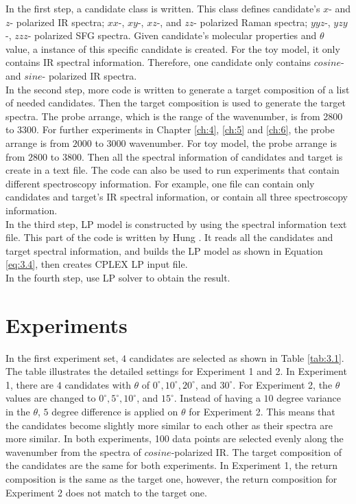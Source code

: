 In the first step, a candidate class is written. This class defines candidate's $x$- and $z$- polarized IR spectra; $xx$-, $xy$-, $xz$-, and $zz$- polarized Raman spectra; $yyz$-, $yzy$-, $zzz$- polarized SFG spectra. Given candidate's molecular properties and $\theta$ value, a instance of this specific candidate is created. For the toy model, it only contains IR spectral information. Therefore, one candidate only contains $cosine$- and $sine$- polarized IR spectra. \\

In the second step, more code is written to generate a target composition of a list of needed candidates. Then the target composition is used to generate the target spectra. The probe arrange, which is the range of the wavenumber, is from 2800 to 3300. For further experiments in Chapter \ref{ch:4}, \ref{ch:5} and \ref{ch:6}, the probe arrange is from $2000$ to $3000$ wavenumber. For toy model, the probe arrange is from $2800$ to $3800$. Then all the spectral information of candidates and target is create in a text file. The code can also be used to run experiments that contain different spectroscopy information. For example, one file can contain only candidates and target's IR spectral information, or contain all three spectroscopy information. \\

In the third step, LP model is constructed by using the spectral information text file. This part of the code is written by Hung \cite{KuoKaiHung:Thesis:2015}. It reads all the candidates and target spectral information, and builds the LP model as shown in Equation \ref{eq:3.4}, then creates CPLEX LP input file. \\

In the fourth step, use LP solver to obtain the result. \\

\section{Experiments}
In the first experiment set,  $4$ candidates are selected as shown in Table \ref{tab:3.1}. The table illustrates the detailed settings for Experiment 1 and 2. In Experiment 1, there are $4$ candidates with $\theta$ of $0^{\circ}, 10^{\circ}, 20^{\circ}$, and $30^{\circ}$. For Experiment 2, the $\theta$ values are changed to $0^{\circ}, 5^{\circ}, 10^{\circ}$, and $15^{\circ}$. Instead of having a $10$ degree variance in the $\theta$, $5$ degree difference is applied on $\theta$ for Experiment 2. This means that the candidates become slightly more similar to each other as their spectra are more similar. In both experiments, 100 data points are selected evenly along the wavenumber from the spectra of $cosine$-polarized IR. The target composition of the candidates are the same for both experiments. In Experiment 1, the return composition is the same as the target one, however, the return composition for Experiment 2 does not match to the target one. %

